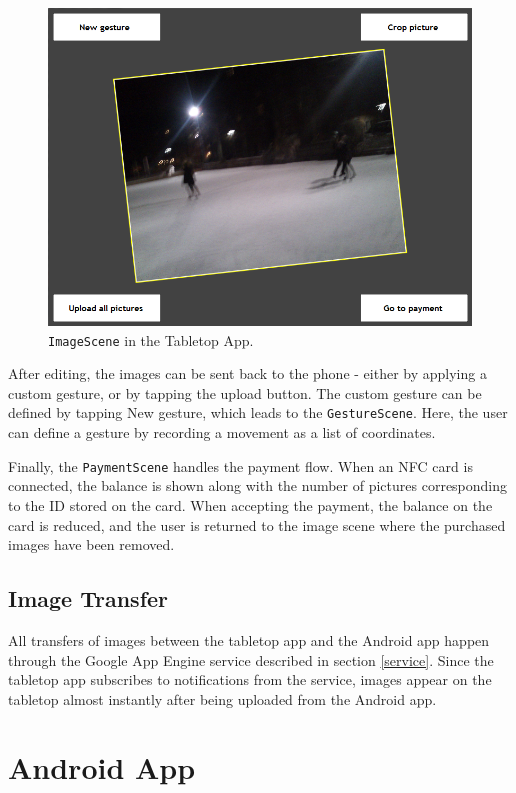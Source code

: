 \documentclass{ubicomp2011}
\begin{document}
\begin{figure}[t]
\begin{center}
\includegraphics[width=0.90\columnwidth]{image-scene.png}
\end{center}
\caption{\lstinline{ImageScene} in the Tabletop App.}
\label{fig:image-scene}
\end{figure}

After editing, the images can be sent back to the phone - either by applying a custom gesture, or by tapping the upload button. The custom gesture can be defined by tapping New gesture, which leads to the \lstinline{GestureScene}. Here, the user can define a gesture by recording a movement as a list of coordinates.

Finally, the \lstinline{PaymentScene} handles the payment flow. When an NFC card is connected, the balance is shown along with the number of pictures corresponding to the ID stored on the card. When accepting the payment, the balance on the card is reduced, and the user is returned to the image scene where the purchased images have been removed.

\subsection{Image Transfer}
All transfers of images between the tabletop app and the Android app happen through the Google App Engine service described in section \ref{service}. Since the tabletop app subscribes to notifications from the service, images appear on the tabletop almost instantly after being uploaded from the Android app.

\section{Android App}
\end{document}
